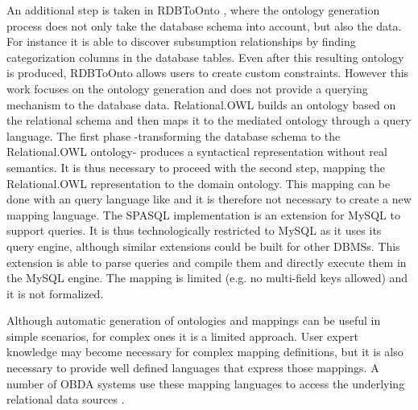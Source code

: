An additional step is taken in RDBToOnto \cite{Cerbah_08} , where the ontology generation process does not only take the database schema into account, but also the data. For instance it is able to discover subsumption relationships by finding categorization columns in the database tables. Even after this resulting ontology is produced, RDBToOnto allows users to create custom constraints. However this work focuses on the ontology generation and does not provide a querying mechanism to the database data.
Relational.OWL \cite{Laborda_06} builds an ontology based on the relational schema and then maps it to the mediated ontology through a \rdf query language. The first phase -transforming the database schema to the Relational.OWL ontology- produces a syntactical representation without real semantics. It is thus necessary to proceed with the second step, mapping the Relational.OWL representation to the domain ontology. This mapping can be done with an \rdf query language like \sparql and it is therefore not necessary to create a new mapping language.
The SPASQL implementation \cite{Prudhommeaux_07} is an extension for MySQL to support \sparql queries. It is thus technologically restricted to MySQL as it uses its query engine, although similar extensions could be built for other DBMSs. This extension is able to parse \sparql queries and compile them and directly execute them in the MySQL engine. The mapping is limited (e.g. no multi-field keys allowed) and it is not formalized.

Although automatic generation of ontologies and mappings can be useful in simple scenarios, for complex ones it is a limited approach. User expert knowledge may become necessary for complex mapping definitions, but it is also necessary to provide well defined languages that express those mappings. A number of OBDA systems use these mapping languages to 
access the underlying relational data sources \cite{Sahoo_09}.

